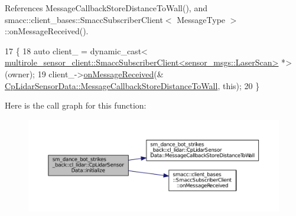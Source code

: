 References Message\+Callback\+Store\+Distance\+To\+Wall(), and smacc\+::client\+\_\+bases\+::\+Smacc\+Subscriber\+Client$<$ Message\+Type $>$\+::on\+Message\+Received().


\begin{DoxyCode}
17   \{
18     \textcolor{keyword}{auto} client\_ = \textcolor{keyword}{dynamic\_cast<}
      \hyperlink{classsmacc_1_1client__bases_1_1SmaccSubscriberClient}{multirole\_sensor\_client::SmaccSubscriberClient<sensor\_msgs::LaserScan>}
       *\textcolor{keyword}{>}(owner);
19     client\_->\hyperlink{classsmacc_1_1client__bases_1_1SmaccSubscriberClient_a4f02251e3a161fb6d802b154b1081f18}{onMessageReceived}(&
      \hyperlink{classsm__dance__bot__strikes__back_1_1cl__lidar_1_1CpLidarSensorData_aefe481c1441305a6adf5266c49d941a4}{CpLidarSensorData::MessageCallbackStoreDistanceToWall},
       \textcolor{keyword}{this});
20   \}
\end{DoxyCode}


Here is the call graph for this function\+:
\nopagebreak
\begin{figure}[H]
\begin{center}
\leavevmode
\includegraphics[width=350pt]{classsm__dance__bot__strikes__back_1_1cl__lidar_1_1CpLidarSensorData_a8ea64aab6a48e8359a195a8766703c26_cgraph}
\end{center}
\end{figure}


